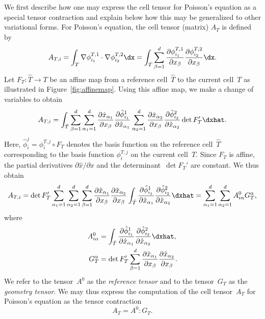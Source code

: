 We first describe how one may express the cell tensor for Poisson's
equation as a special tensor contraction and explain below how this
may be generalized to other variational forms. For Poisson's equation,
the cell tensor (matrix) $A_T$ is defined by
\begin{equation}
  A_{T,i} =
  \int_T
  \nabla \phi_{i_1}^{T,1} \cdot
  \nabla \phi_{i_2}^{T,2} \dx
  =
  \int_T
  \sum_{\beta=1}^d
  \frac{\partial \phi_{i_1}^{T,1}}{\partial x_{\beta}}
  \frac{\partial \phi_{i_2}^{T,2}}{\partial x_{\beta}} \dx.
\end{equation}
Let $F_T : \hat{T} \rightarrow T$ be an affine map from a
reference cell~$\hat{T}$ to the current cell~$T$ as illustrated in
Figure~\ref{fig:affinemap}. Using this affine map, we make a change of
variables to obtain
\begin{equation}
  A_{T,i} =
  \int_{\hat{T}}
  \sum_{\beta=1}^d
  \sum_{\alpha_1=1}^d
  \frac{\partial \hat{x}_{\alpha_1}}{\partial x_{\beta}}
  \frac{\partial \hat{\phi}^1_{i_1}}{\partial \hat{x}_{\alpha_1}}
  \sum_{\alpha_2=1}^d
  \frac{\partial \hat{x}_{\alpha_2}}{\partial x_{\beta}}
  \frac{\partial \hat{\phi}^2_{i_2}}{\partial \hat{x}_{\alpha_2}}
  \det F_T'
  \dxhat.
\end{equation}
Here, $\hat{\phi}_i^j = \phi_i^{T,j} \circ F_T$ denotes the basis function
on the reference cell~$\hat{T}$ corresponding to the basis function
$\phi_i^{T,j}$ on the current cell~$T$. Since $F_T$ is affine, the
partial derivatives $\partial \hat{x} / \partial x$ and the determinant~$\det F_T'$
are constant. We thus obtain
\begin{equation}
  A_{T,i} =
  \det F_T'
  \sum_{\alpha_1=1}^d
  \sum_{\alpha_2=1}^d
  \sum_{\beta=1}^d
  \frac{\partial \hat{x}_{\alpha_1}}{\partial x_{\beta}}
  \frac{\partial \hat{x}_{\alpha_2}}{\partial x_{\beta}}
  \int_{\hat{T}}
  \frac{\partial \hat{\phi}^1_{i_1}}{\partial \hat{x}_{\alpha_1}}
  \frac{\partial \hat{\phi}^2_{i_2}}{\partial \hat{x}_{\alpha_2}}
  \dxhat
  =
  \sum_{\alpha_1=1}^d
  \sum_{\alpha_2=1}^d
  A^0_{i\alpha} G_T^{\alpha},
\end{equation}
where
\begin{equation} \label{eq:poisson,AandG}
  \begin{split}
    A^0_{i\alpha}
    &=
    \int_{\hat{T}}
    \frac{\partial \hat{\phi}^1_{i_1}}{\partial \hat{x}_{\alpha_1}}
    \frac{\partial \hat{\phi}^2_{i_2}}{\partial \hat{x}_{\alpha_2}}
    \dxhat, \\
    G_T^{\alpha}
    &=
    \det F_T'
    \sum_{\beta=1}^d
    \frac{\partial \hat{x}_{\alpha_1}}{\partial x_{\beta}}
    \frac{\partial \hat{x}_{\alpha_2}}{\partial x_{\beta}}.
  \end{split}
\end{equation}
We refer to the tensor~$A^0$ as the \emph{reference tensor} and to the
tensor~$G_T$ as the \emph{geometry tensor}. We may thus express the
computation of the cell tensor~$A_T$ for Poisson's equation as the
tensor contraction
\begin{equation}
  A_T = A^0 : G_T.
\end{equation}

